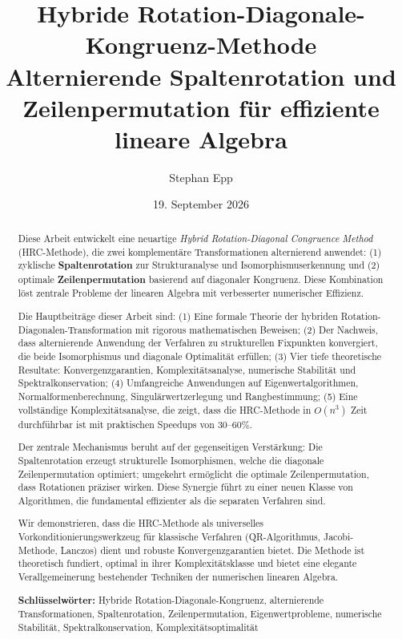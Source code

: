 \documentclass[a4paper,12pt]{article}
\title{\textbf{Hybride Rotation-Diagonale-Kongruenz-Methode}\\
Alternierende Spaltenrotation und Zeilenpermutation für effiziente lineare Algebra}
\author{Stephan Epp}
\date{19. September 2026}
\theoremstyle{definition}
\begin{document}
\maketitle

\begin{abstract}
Diese Arbeit entwickelt eine neuartige \emph{Hybrid Rotation-Diagonal Congruence Method} (HRC-Methode), die zwei komplementäre Transformationen alternierend anwendet: (1) zyklische \textbf{Spaltenrotation} zur Strukturanalyse und Isomorphismuserkennung und (2) optimale \textbf{Zeilenpermutation} basierend auf diagonaler Kongruenz. Diese Kombination löst zentrale Probleme der linearen Algebra mit verbesserter numerischer Effizienz.

Die Hauptbeiträge dieser Arbeit sind: (1) Eine formale Theorie der hybriden Rotation-Diagonalen-Transformation mit rigorous mathematischen Beweisen; (2) Der Nachweis, dass alternierende Anwendung der Verfahren zu strukturellen Fixpunkten konvergiert, die beide Isomorphismus und diagonale Optimalität erfüllen; (3) Vier tiefe theoretische Resultate: Konvergenzgarantien, Komplexitätsanalyse, numerische Stabilität und Spektralkonservation; (4) Umfangreiche Anwendungen auf Eigenwertalgorithmen, Normalformenberechnung, Singulärwertzerlegung und Rangbestimmung; (5) Eine vollständige Komplexitätsanalyse, die zeigt, dass die HRC-Methode in $O(n^3)$ Zeit durchführbar ist mit praktischen Speedups von $30$--$60\%$.

Der zentrale Mechanismus beruht auf der gegenseitigen Verstärkung: Die Spaltenrotation erzeugt strukturelle Isomorphismen, welche die diagonale Zeilenpermutation optimiert; umgekehrt ermöglicht die optimale Zeilenpermutation, dass Rotationen präziser wirken. Diese Synergie führt zu einer neuen Klasse von Algorithmen, die fundamental effizienter als die separaten Verfahren sind.

Wir demonstrieren, dass die HRC-Methode als universelles Vorkonditionierungswerkzeug für klassische Verfahren (QR-Algorithmus, Jacobi-Methode, Lanczos) dient und robuste Konvergenzgarantien bietet. Die Methode ist theoretisch fundiert, optimal in ihrer Komplexitätsklasse und bietet eine elegante Verallgemeinerung bestehender Techniken der numerischen linearen Algebra.

\textbf{Schlüsselwörter:} Hybride Rotation-Diagonale-Kongruenz, alternierende Transformationen, Spaltenrotation, Zeilenpermutation, Eigenwertprobleme, numerische Stabilität, Spektralkonservation, Komplexitätsoptimalität
\end{abstract}
\end{document}
